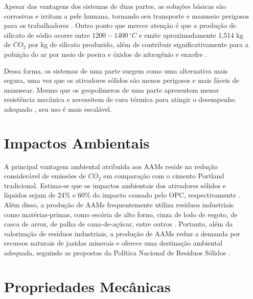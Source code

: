 Apesar das vantagens dos sistemas de duas partes, as soluções básicas são corrosivas e irritam a pele humana, tornando seu transporte e manuseio perigosos para os trabalhadores \cite{awoyera2019critical}.
Outro ponto que merece atenção é que a produção de silicato de sódio ocorre entre $1200-1400\ ^\circ C$ e emite aproximadamente 1,514 kg de $CO_2$ por kg de silicato produzido, além de contribuir significativamente para a poluição do ar por meio de poeira e óxidos de nitrogênio e enxofre \cite{rajan2020sustainable}.

Dessa forma, os sistemas de uma parte surgem como uma alternativa mais segura, uma vez que os ativadores sólidos são menos perigosos e mais fáceis de manusear. Mesmo que os geopolímeros de uma parte apresentem menor resistência mecânica e necessitem de cura térmica para atingir o desempenho adequado \cite{provis2018alkali}, seu uso é mais escalável.

\section{Impactos Ambientais}

A principal vantagem ambiental atribuída aos AAMs reside na redução considerável de emissões de $CO_2$ em comparação com o cimento Portland tradicional.
Estima-se que os impactos ambientais dos ativadores sólidos e líquidos sejam de 24\% e 60\% do impacto causado pelo OPC, respectivamente \cite{luukkonen2017review}.
Além disso, a produção de AAMs frequentemente utiliza resíduos industriais como matérias-primas, como escória de alto forno, cinza de lodo de esgoto, de casca de arroz, de palha de cana-de-açúcar, entre outros \cite{moraes2024scsa}.
Portanto, além da valorização de resíduos industriais, a produção de AAMs reduz a demanda por recursos naturais de jazidas minerais e oferece uma destinação ambiental adequada, seguindo as propostas da Política Nacional de Resíduos Sólidos \cite{PNRS2016}.

\section{Propriedades Mecânicas}

